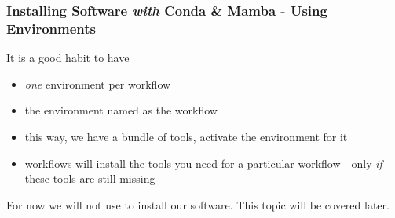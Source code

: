 \begin{frame}
  \frametitle{Installing Software \emph{with} Conda \& Mamba - Using Environments}
  \begin{hint}It is a good habit to have
        \begin{itemize}
          \item \emph{one} environment per workflow
          \item the environment named as the workflow
          \item this way, we have a bundle of tools, activate the environment for it
          \item \Snakemake{} workflows will install the tools you need for a particular workflow - only \emph{if} these tools are still missing
         \end{itemize}
  \end{hint}
  \begin{hint}[Note]
  	For now we will not use \Snakemake{} to install our software. This topic will be covered later.
  \end{hint}
\end{frame}

